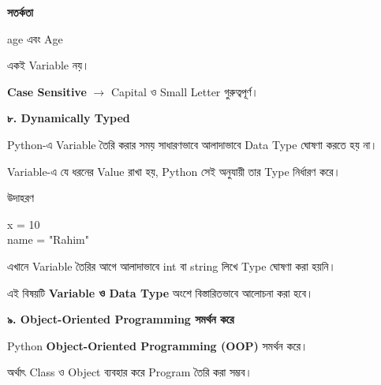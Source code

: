 \begin{rememberbox}

\textbf{\color{deepOrange}সতর্কতা}

\textenglish{\ttfamily age}
এবং
\textenglish{\ttfamily Age}

একই Variable নয়।

\medskip

\textbf{Case Sensitive}
\(\longrightarrow\)
Capital ও Small Letter গুরুত্বপূর্ণ।

\end{rememberbox}


\textbf{\color{darkTeal}৮. Dynamically Typed}

Python-এ Variable তৈরি করার সময় সাধারণভাবে
আলাদাভাবে Data Type ঘোষণা করতে হয় না।

Variable-এ যে ধরনের Value রাখা হয়, Python সেই অনুযায়ী
তার Type নির্ধারণ করে।

\begin{examplebox}{উদাহরণ}

\begin{codebox}

\begin{english}
\ttfamily
x = 10\\
name = "Rahim"
\end{english}

\end{codebox}

এখানে Variable তৈরির আগে আলাদাভাবে
\textenglish{\ttfamily int}
বা
\textenglish{\ttfamily string}
লিখে Type ঘোষণা করা হয়নি।

\end{examplebox}

\begin{rememberbox}

এই বিষয়টি
\textbf{Variable ও Data Type}
অংশে বিস্তারিতভাবে আলোচনা করা হবে।

\end{rememberbox}


\textbf{\color{darkTeal}৯. Object-Oriented Programming সমর্থন করে}

Python
\textbf{Object-Oriented Programming (OOP)}
সমর্থন করে।

অর্থাৎ Class ও Object ব্যবহার করে Program তৈরি করা সম্ভব।

